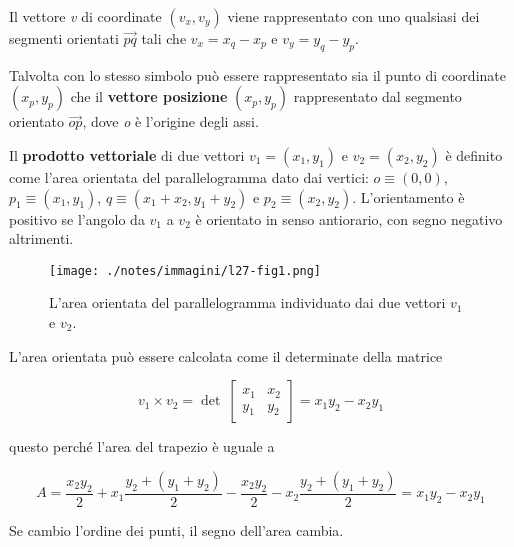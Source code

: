 Il vettore \emph{v} di coordinate $(v_x, v_y)$ viene rappresentato con uno qualsiasi dei segmenti orientati $\overrightarrow{pq}$ tali
che $v_x = x_q-x_p$ e $v_y = y_q - y_p$.

Talvolta con lo stesso simbolo può essere rappresentato sia il punto di coordinate $(x_p,y_p)$ che il \textbf{vettore posizione} $(x_p,y_p)$ rappresentato dal segmento orientato $\overrightarrow{op}$, dove \textit{o} è l'origine degli assi.

Il \textbf{prodotto vettoriale} di due vettori $v_1 = (x_1,y_1)$ e $v_2 = (x_2,y_2)$ è definito come l'area orientata del parallelogramma dato dai vertici: $o \equiv (0,0)$, $p_1 \equiv (x_1,y_1)$, $q \equiv  (x_1+x_2, y_1+y_2)$ e $p_2 \equiv (x_2, y_2)$.
L'orientamento è positivo se l'angolo da $v_1$ a $v_2$ è orientato in senso antiorario, con segno negativo altrimenti.

\begin{figure}
	\centering
	\texttt{[image: ./notes/immagini/l27-fig1.png]}
	\caption{L'area orientata del parallelogramma individuato dai due vettori $v_1$ e $v_2$.}
\end{figure}

L'area orientata può essere calcolata come il determinate della matrice

$$
v_1 \times v_2 = \det \: \begin{bmatrix}
x_1 & x_2 \\
y_1 & y_2
\end{bmatrix} = x_1 y_2 - x_2 y_1
$$

questo perché l'area del trapezio è uguale a

$$
A = \frac{x_2y_2}{2} + x_1\frac{y_2+(y_1+y_2)}{2} - \frac{x_2y_2}{2} - x_2\frac{y_2+ (y_1+y_2)}{2} = x_1y_2 - x_2y_1
$$

Se cambio l'ordine dei punti, il segno dell'area cambia.
